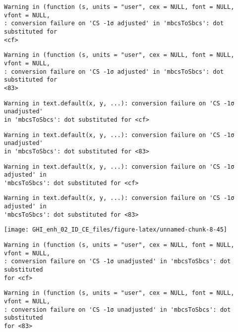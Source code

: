 \documentclass[
  10pt,
  a4paper,oneside]{article}
\begin{document}
\begin{verbatim}
Warning in (function (s, units = "user", cex = NULL, font = NULL, vfont = NULL,
: conversion failure on 'CS -1σ adjusted' in 'mbcsToSbcs': dot substituted for
<cf>
\end{verbatim}

\begin{verbatim}
Warning in (function (s, units = "user", cex = NULL, font = NULL, vfont = NULL,
: conversion failure on 'CS -1σ adjusted' in 'mbcsToSbcs': dot substituted for
<83>
\end{verbatim}

\begin{verbatim}
Warning in text.default(x, y, ...): conversion failure on 'CS -1σ unadjusted'
in 'mbcsToSbcs': dot substituted for <cf>
\end{verbatim}

\begin{verbatim}
Warning in text.default(x, y, ...): conversion failure on 'CS -1σ unadjusted'
in 'mbcsToSbcs': dot substituted for <83>
\end{verbatim}

\begin{verbatim}
Warning in text.default(x, y, ...): conversion failure on 'CS -1σ adjusted' in
'mbcsToSbcs': dot substituted for <cf>
\end{verbatim}

\begin{verbatim}
Warning in text.default(x, y, ...): conversion failure on 'CS -1σ adjusted' in
'mbcsToSbcs': dot substituted for <83>
\end{verbatim}

\begin{center}\texttt{[image: GHI\_enh\_02\_ID\_CE\_files/figure-latex/unnamed-chunk-8-45]} \end{center}

\begin{verbatim}
Warning in (function (s, units = "user", cex = NULL, font = NULL, vfont = NULL,
: conversion failure on 'CS -1σ unadjusted' in 'mbcsToSbcs': dot substituted
for <cf>
\end{verbatim}

\begin{verbatim}
Warning in (function (s, units = "user", cex = NULL, font = NULL, vfont = NULL,
: conversion failure on 'CS -1σ unadjusted' in 'mbcsToSbcs': dot substituted
for <83>
\end{verbatim}
\end{document}
